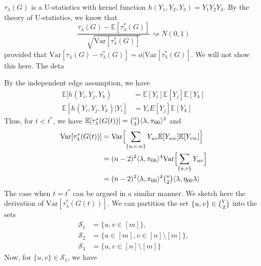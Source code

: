 \documentclass[final]{IEEEtran}
\theoremstyle{definition}
\begin{document}
\begin{IEEEproof}
  $\tau_{\lambda}(G)$ is a U-statistics with kernel function
  $h(Y_1, Y_2, Y_3) = Y_1 Y_2 Y_3$. By the theory of U-statistics, we
  know that
  \begin{equation}
    \label{eq:48}
    \frac{\tau_{\lambda}(G) -
      \mathbb{E}[\tau_{\lambda}^{*}(G)]}{\sqrt{\mathrm{Var}[\tau_{\lambda}^{*}(G)]}}
    \rightsquigarrow N(0,1)
  \end{equation}
  provided that $\mathrm{Var}[\tau_{\lambda}(G) -
  \tau_{\lambda}^{*}(G)] = o(\mathrm{Var}[\tau_{\lambda}^{*}(G)]$. We
  will not show this here. The deta 

By the independent edge
  assumption, we have 
  \begin{align}
    \mathbb{E}[h(Y_i, Y_j, Y_k) &= \mathbb{E}[Y_i]
  \mathbb{E}[Y_j] \mathbb{E}[Y_k] \\ 
  \mathbb{E}[h(Y_i, Y_j, Y_k) |
  Y_i] &= Y_i E[Y_j] \mathbb{E}[Y_k] 
  \end{align}
 Thus, for $t < t^{*}$, we have $\mathbb{E}[\tau_{\lambda}^{*}(G(t))] = \tbinom{n}{3} \langle
  \lambda, \pi_{00} \rangle^{3}$ and
  \begin{equation}
    \begin{split}
      \mathrm{Var}[\tau_{\lambda}^{*}(G(t))] &=
      \mathrm{Var}\Bigl[\sum_{\{u,v,w\}} Y_{uv} \mathbb{E}[Y_{uw}]
      \mathbb{E}[Y_{vw}]\Bigr] \\
      &= (n-2)^{2} \langle \lambda, \pi_{00} \rangle^{4}
      \mathrm{Var}\Bigl[\sum_{\{u,v\}} Y_{uv} \Bigr] \\
      &= (n-2)^{2} \langle \lambda, \pi_{00} \rangle^{4} \tbinom{n}{2}
      \langle \lambda, \eta_{00} \lambda \rangle
    \end{split}
  \end{equation}
  The case when $t = t^{*}$ can be argued in a similar manner. We
  sketch here the derivation of
  $\mathrm{Var}[\tau_{\lambda}^{*}(G(t))]$. We can partition the set
  $\{u,v\} \in \tbinom{V}{2}$ into the sets 
\begin{align*}
\mathcal{S}_1 &= \{ u,v \in [m]
  \}, \\ \mathcal{S}_2 &= \{ u \in [m], v \in [n] \setminus [m]\}, \\
  \mathcal{S}_3 &= \{ u, v \in [n] \setminus[m]\}
\end{align*} Now, for $\{u,v\} \in \mathcal{S}_1$, we have
\begin{equation}
  \label{eq:58}
  \begin{split}

\end{split}
\end{equation}
\end{IEEEproof}
\end{document}
